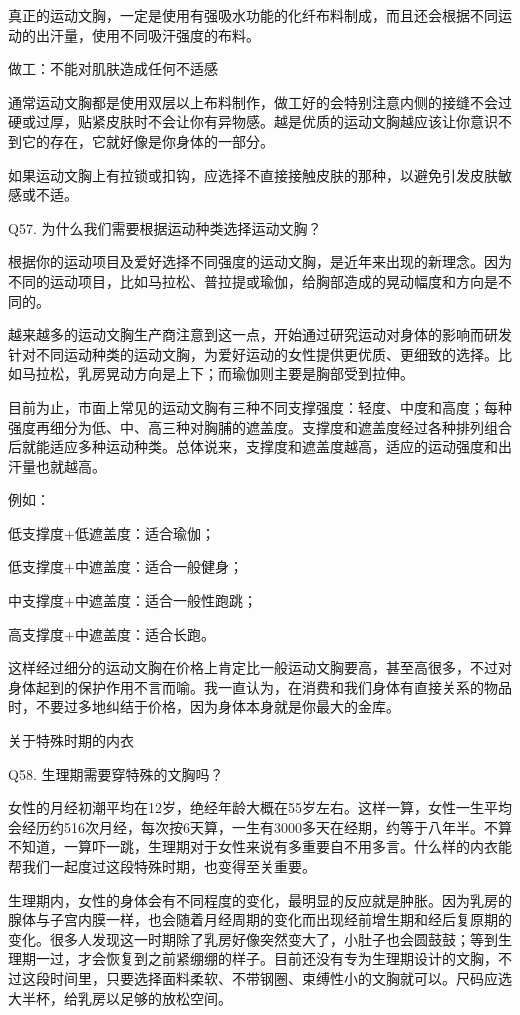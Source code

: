 \documentclass[12pt,UTF8]{ctexbook}
\begin{document}
真正的运动文胸，一定是使用有强吸水功能的化纤布料制成，而且还会根据不同运动的出汗量，使用不同吸汗强度的布料。

做工：不能对肌肤造成任何不适感

通常运动文胸都是使用双层以上布料制作，做工好的会特别注意内侧的接缝不会过硬或过厚，贴紧皮肤时不会让你有异物感。越是优质的运动文胸越应该让你意识不到它的存在，它就好像是你身体的一部分。

如果运动文胸上有拉锁或扣钩，应选择不直接接触皮肤的那种，以避免引发皮肤敏感或不适。





Q57. 为什么我们需要根据运动种类选择运动文胸？


根据你的运动项目及爱好选择不同强度的运动文胸，是近年来出现的新理念。因为不同的运动项目，比如马拉松、普拉提或瑜伽，给胸部造成的晃动幅度和方向是不同的。

越来越多的运动文胸生产商注意到这一点，开始通过研究运动对身体的影响而研发针对不同运动种类的运动文胸，为爱好运动的女性提供更优质、更细致的选择。比如马拉松，乳房晃动方向是上下；而瑜伽则主要是胸部受到拉伸。

目前为止，市面上常见的运动文胸有三种不同支撑强度：轻度、中度和高度；每种强度再细分为低、中、高三种对胸脯的遮盖度。支撑度和遮盖度经过各种排列组合后就能适应多种运动种类。总体说来，支撑度和遮盖度越高，适应的运动强度和出汗量也就越高。


例如：

低支撑度+低遮盖度：适合瑜伽；

低支撑度+中遮盖度：适合一般健身；

中支撑度+中遮盖度：适合一般性跑跳；

高支撑度+中遮盖度：适合长跑。



这样经过细分的运动文胸在价格上肯定比一般运动文胸要高，甚至高很多，不过对身体起到的保护作用不言而喻。我一直认为，在消费和我们身体有直接关系的物品时，不要过多地纠结于价格，因为身体本身就是你最大的金库。





关于特殊时期的内衣


Q58. 生理期需要穿特殊的文胸吗？


女性的月经初潮平均在12岁，绝经年龄大概在55岁左右。这样一算，女性一生平均会经历约516次月经，每次按6天算，一生有3000多天在经期，约等于八年半。不算不知道，一算吓一跳，生理期对于女性来说有多重要自不用多言。什么样的内衣能帮我们一起度过这段特殊时期，也变得至关重要。

生理期内，女性的身体会有不同程度的变化，最明显的反应就是肿胀。因为乳房的腺体与子宫内膜一样，也会随着月经周期的变化而出现经前增生期和经后复原期的变化。很多人发现这一时期除了乳房好像突然变大了，小肚子也会圆鼓鼓；等到生理期一过，才会恢复到之前紧绷绷的样子。目前还没有专为生理期设计的文胸，不过这段时间里，只要选择面料柔软、不带钢圈、束缚性小的文胸就可以。尺码应选大半杯，给乳房以足够的放松空间。
\end{document}
